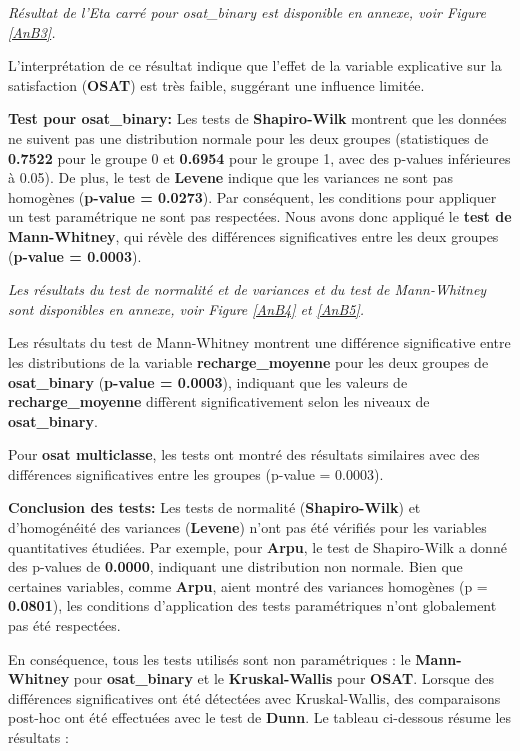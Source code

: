 \textit{Résultat de l'Eta carré pour osat\_binary est disponible en annexe, voir Figure \ref{AnB3}.}


L'interprétation de ce résultat indique que l'effet de la variable explicative sur la satisfaction (\textbf{OSAT}) est très faible, suggérant une influence limitée.

\textbf{\checkmark Test pour \textbf{osat\_binary}:} Les tests de \textbf{Shapiro-Wilk} montrent que les données ne suivent pas une distribution normale pour les deux groupes (statistiques de \textbf{0.7522} pour le groupe 0 et \textbf{0.6954} pour le groupe 1, avec des p-values inférieures à 0.05). De plus, le test de \textbf{Levene} indique que les variances ne sont pas homogènes (\textbf{p-value = 0.0273}). Par conséquent, les conditions pour appliquer un test paramétrique ne sont pas respectées. Nous avons donc appliqué le \textbf{test de Mann-Whitney}, qui révèle des différences significatives entre les deux groupes (\textbf{p-value = 0.0003}). 


\textit{Les résultats du test de normalité et de variances et du test de Mann-Whitney sont disponibles en annexe, voir Figure \ref{AnB4} et \ref{AnB5}.}



Les résultats du test de Mann-Whitney montrent une différence significative entre les distributions de la variable \textbf{recharge\_moyenne} pour les deux groupes de \textbf{osat\_binary} (\textbf{p-value = 0.0003}), indiquant que les valeurs de \textbf{recharge\_moyenne} diffèrent significativement selon les niveaux de \textbf{osat\_binary}.

Pour \textbf{osat multiclasse}, les tests ont montré des résultats similaires avec des différences significatives entre les groupes (p-value = 0.0003).

\textbf{Conclusion des tests:} Les tests de normalité (\textbf{Shapiro-Wilk}) et d'homogénéité des variances (\textbf{Levene}) n'ont pas été vérifiés pour les variables quantitatives étudiées. Par exemple, pour \textbf{Arpu}, le test de Shapiro-Wilk a donné des p-values de \textbf{0.0000}, indiquant une distribution non normale. Bien que certaines variables, comme \textbf{Arpu}, aient montré des variances homogènes (p = \textbf{0.0801}), les conditions d'application des tests paramétriques n'ont globalement pas été respectées.

En conséquence, tous les tests utilisés sont non paramétriques : le \textbf{Mann-Whitney} pour \textbf{osat\_binary} et le \textbf{Kruskal-Wallis} pour \textbf{OSAT}. Lorsque des différences significatives ont été détectées avec Kruskal-Wallis, des comparaisons post-hoc ont été effectuées avec le test de \textbf{Dunn}. Le tableau ci-dessous résume les résultats :

